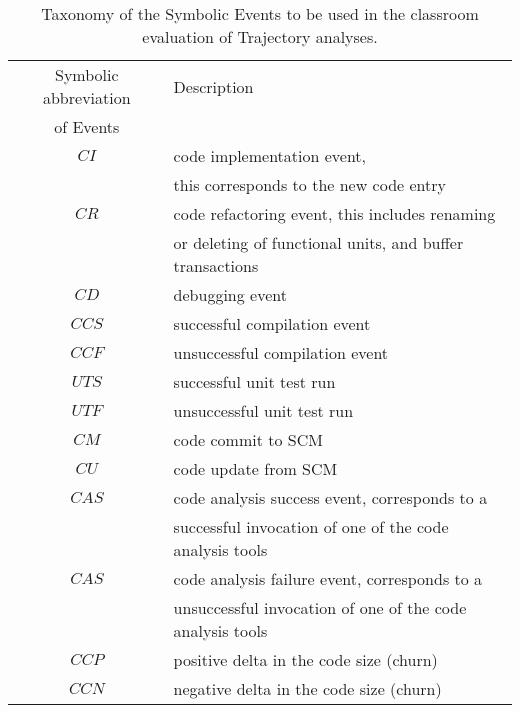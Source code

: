 \begin{table}
\begin{center}
    \begin{tabular}{ | c | l | }
    \hline
    Symbolic abbreviation & Description \\ 
     of Events 						& 	  \\ 
    \hline
    $CI$                  & code implementation event, \\
    											& this corresponds to the new code entry \\
    \hline    											
    $CR$                  & code refactoring event, this includes renaming \\
    											& or deleting of functional units, and buffer transactions \\
    \hline
    $CD$                  & debugging event \\
		\hline
		$CCS$                 & successful compilation event \\
		\hline
		$CCF$                 & unsuccessful compilation event \\
    \hline
		$UTS$                 & successful unit test run \\
		\hline
		$UTF$                 & unsuccessful unit test run \\
		\hline
		$CM$                  & code commit to SCM \\
		\hline
		$CU$                  & code update from SCM \\
		\hline
    $CAS$                 & code analysis success event, corresponds to a \\
                          & successful invocation of one of the code analysis tools \\
    \hline
		$CAS$                 & code analysis failure event, corresponds to a \\
                          & unsuccessful invocation of one of the code analysis tools \\
    \hline    
    $CCP$                 & positive delta in the code size (churn) \\
    \hline
    $CCN$                 & negative delta in the code size (churn) \\
    \hline
    \end{tabular}
    \caption{Taxonomy of the Symbolic Events to be used in the classroom evaluation of Trajectory analyses.}
    \label{fig:data_collected_points}
    \end{center}
\end{table}

